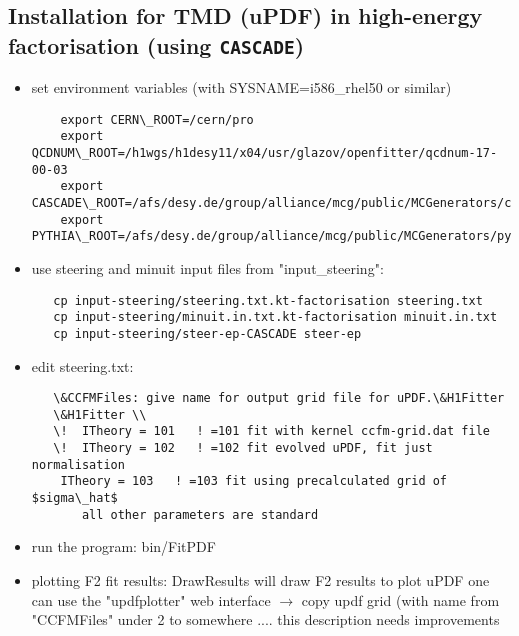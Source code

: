\subsection{Installation for TMD (uPDF) in high-energy factorisation (using  {\tt CASCADE})}

\begin{itemize}

\item  set environment variables (with {SYSNAME=i586\_rhel50} or similar)
    
\begin{verbatim}
    export CERN\_ROOT=/cern/pro  
    export QCDNUM\_ROOT=/h1wgs/h1desy11/x04/usr/glazov/openfitter/qcdnum-17-00-03
    export CASCADE\_ROOT=/afs/desy.de/group/alliance/mcg/public/MCGenerators/cascade/2.2.04/\$SYSNAME 
    export PYTHIA\_ROOT=/afs/desy.de/group/alliance/mcg/public/MCGenerators/pythia6/425/\$SYSNAME}
    \end{verbatim}	

\item use steering and minuit input files from "input\_steering": 

   \begin{verbatim} 
   cp input-steering/steering.txt.kt-factorisation steering.txt 
   cp input-steering/minuit.in.txt.kt-factorisation minuit.in.txt 
   cp input-steering/steer-ep-CASCADE steer-ep 
   \end{verbatim}

\item  edit steering.txt: 
 \begin{verbatim}
   \&CCFMFiles: give name for output grid file for uPDF.\&H1Fitter 
   \&H1Fitter \\ 
   \!  ITheory = 101   ! =101 fit with kernel ccfm-grid.dat file 
   \!  ITheory = 102   ! =102 fit evolved uPDF, fit just normalisation 
    ITheory = 103   ! =103 fit using precalculated grid of $sigma\_hat$
       all other parameters are standard
  \end{verbatim}

\item run the program: bin/FitPDF 
   
\item plotting F2 fit results:
   DrawResults \! will draw F2 results to plot uPDF one can use the "updfplotter" web interface $\to$ copy updf grid (with name from "CCFMFiles" under 2 to somewhere .... this description needs improvements
\end{itemize}

